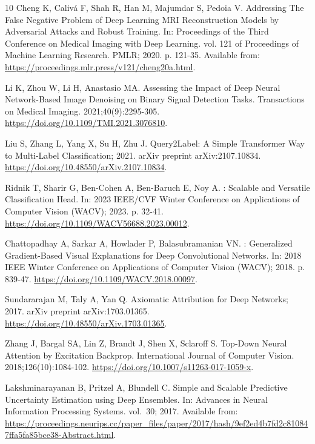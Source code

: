 \begin{thebibliography}{10}
Cheng K, Caliv{\'a} F, Shah R, Han M, Majumdar S, Pedoia V.
\newblock Addressing The False Negative Problem of Deep Learning {MRI}
  Reconstruction Models by Adversarial Attacks and Robust Training.
\newblock In: Proceedings of the Third Conference on Medical Imaging with Deep
  Learning. vol. 121 of Proceedings of Machine Learning Research. PMLR; 2020.
  p. 121-35.
\newblock Available from:
  \url{https://proceedings.mlr.press/v121/cheng20a.html}.

Li K, Zhou W, Li H, Anastasio MA.
\newblock Assessing the Impact of Deep Neural Network-Based Image Denoising on
  Binary Signal Detection Tasks.
 Transactions on Medical Imaging. 2021;40(9):2295-305.
\newblock \url{https://doi.org/10.1109/TMI.2021.3076810}.

Liu S, Zhang L, Yang X, Su H, Zhu J. {Query2Label}: A Simple Transformer Way to
  Multi-Label Classification; 2021.
\newblock arXiv preprint arXiv:2107.10834.
\newblock \url{https://doi.org/10.48550/arXiv.2107.10834}.

Ridnik T, Sharir G, Ben-Cohen A, Ben-Baruch E, Noy A.
: Scalable and Versatile Classification Head.
\newblock In: 2023 IEEE/CVF Winter Conference on Applications of Computer
  Vision (WACV); 2023. p. 32-41.
\newblock \url{https://doi.org/10.1109/WACV56688.2023.00012}.

Chattopadhay A, Sarkar A, Howlader P, Balasubramanian VN.
: Generalized Gradient-Based Visual Explanations for Deep
  Convolutional Networks.
\newblock In: 2018 IEEE Winter Conference on Applications of Computer Vision
  (WACV); 2018. p. 839-47.
\newblock \url{https://doi.org/10.1109/WACV.2018.00097}.

Sundararajan M, Taly A, Yan Q. Axiomatic Attribution for Deep Networks; 2017.
\newblock arXiv preprint arXiv:1703.01365.
\newblock \url{https://doi.org/10.48550/arXiv.1703.01365}.

Zhang J, Bargal SA, Lin Z, Brandt J, Shen X, Sclaroff S.
\newblock Top-Down Neural Attention by Excitation Backprop.
\newblock International Journal of Computer Vision. 2018;126(10):1084-102.
\newblock \url{https://doi.org/10.1007/s11263-017-1059-x}.

Lakshminarayanan B, Pritzel A, Blundell C.
\newblock Simple and Scalable Predictive Uncertainty Estimation using Deep
  Ensembles.
\newblock In: Advances in Neural Information Processing Systems. vol.~30; 2017.
  Available from:
  \url{https://proceedings.neurips.cc/paper_files/paper/2017/hash/9ef2ed4b7fd2c810847ffa5fa85bce38-Abstract.html}.


\end{thebibliography}
